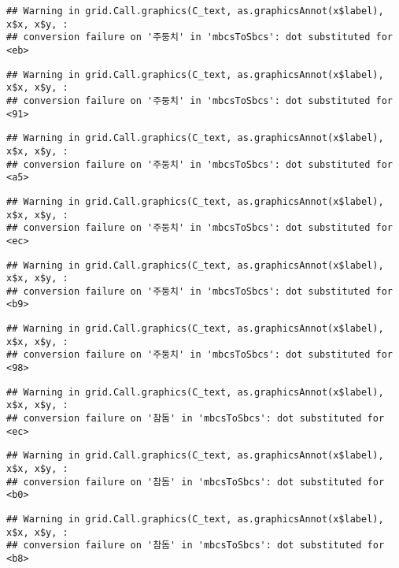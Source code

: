 \documentclass[
]{article}
\begin{document}
\begin{verbatim}
## Warning in grid.Call.graphics(C_text, as.graphicsAnnot(x$label), x$x, x$y, :
## conversion failure on '주둥치' in 'mbcsToSbcs': dot substituted for <eb>
\end{verbatim}

\begin{verbatim}
## Warning in grid.Call.graphics(C_text, as.graphicsAnnot(x$label), x$x, x$y, :
## conversion failure on '주둥치' in 'mbcsToSbcs': dot substituted for <91>
\end{verbatim}

\begin{verbatim}
## Warning in grid.Call.graphics(C_text, as.graphicsAnnot(x$label), x$x, x$y, :
## conversion failure on '주둥치' in 'mbcsToSbcs': dot substituted for <a5>
\end{verbatim}

\begin{verbatim}
## Warning in grid.Call.graphics(C_text, as.graphicsAnnot(x$label), x$x, x$y, :
## conversion failure on '주둥치' in 'mbcsToSbcs': dot substituted for <ec>
\end{verbatim}

\begin{verbatim}
## Warning in grid.Call.graphics(C_text, as.graphicsAnnot(x$label), x$x, x$y, :
## conversion failure on '주둥치' in 'mbcsToSbcs': dot substituted for <b9>
\end{verbatim}

\begin{verbatim}
## Warning in grid.Call.graphics(C_text, as.graphicsAnnot(x$label), x$x, x$y, :
## conversion failure on '주둥치' in 'mbcsToSbcs': dot substituted for <98>
\end{verbatim}

\begin{verbatim}
## Warning in grid.Call.graphics(C_text, as.graphicsAnnot(x$label), x$x, x$y, :
## conversion failure on '참돔' in 'mbcsToSbcs': dot substituted for <ec>
\end{verbatim}

\begin{verbatim}
## Warning in grid.Call.graphics(C_text, as.graphicsAnnot(x$label), x$x, x$y, :
## conversion failure on '참돔' in 'mbcsToSbcs': dot substituted for <b0>
\end{verbatim}

\begin{verbatim}
## Warning in grid.Call.graphics(C_text, as.graphicsAnnot(x$label), x$x, x$y, :
## conversion failure on '참돔' in 'mbcsToSbcs': dot substituted for <b8>
\end{verbatim}
\end{document}
